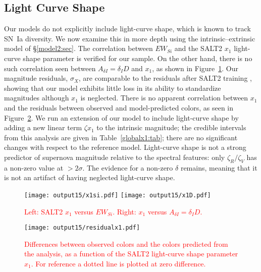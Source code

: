 \documentclass{aastex61}   	%
\begin{document}
\subsection{Light Curve Shape}
Our models do not explicitly include light-curve shape, which is known to track SN~Ia diversity.
We now examine this in more depth using the intrinsic--extrinsic model of \S\ref{model2:sec}.
The correlation between $EW_{Si}$ and the SALT2 $x_1$ light-curve shape parameter is verified
for our sample.
On the other hand, there is no such correlation seen between $A_{\delta I} = \delta_I D$ and $x_1$, as shown in Figure~\ref{x1:fig}. 
Our magnitude residuals, $\sigma_X$, are comparable to the residuals after SALT2 training
\citep{2010A&A...523A...7G}, showing that our model exhibits little loss in its ability to standardize
magnitudes although $x_1$ is neglected.
There is no apparent correlation
between $x_1$ and the residuals between observed and model-predicted colors, as seen in
Figure~\ref{x1res:fig}. 
We  run an extension of our model to include light-curve shape by adding a new linear term $\zeta x_1$ to the 
intrinsic magnitude; the credible intervals
from this analysis are given in Table~\ref{globalx1:tab}; there are no significant changes with respect to the reference model. 
Light-curve shape is not a strong predictor of supernova magnitude relative to the spectral features: only $\zeta_R/\zeta_V$
has a non-zero value at $>2\sigma$.
The evidence for a non-zero $\delta$ remains, meaning that it is not an artifact of
having neglected light-curve shape.

\begin{figure}[htbp] %
   \centering
   \texttt{[image: output15/x1si.pdf]}
   \texttt{[image: output15/x1D.pdf]}
    \caption{\textcolor{red}{Left: SALT2 $x_1$ versus $EW_{Si}$.  Right: $x_1$ versus $A_{\delta I}  = \delta_I D$.}
   \label{x1:fig}}
\end{figure}


\begin{figure}[htbp] %
   \centering
   \texttt{[image: output15/residualx1.pdf]}
    \caption{\textcolor{red}{Differences between observed colors and the colors predicted from the analysis, as a function
            of the SALT2 light-curve shape parameter $x_1$.  For reference a dotted line is plotted at zero difference.}
   \label{x1res:fig}}
\end{figure}
\end{document}
